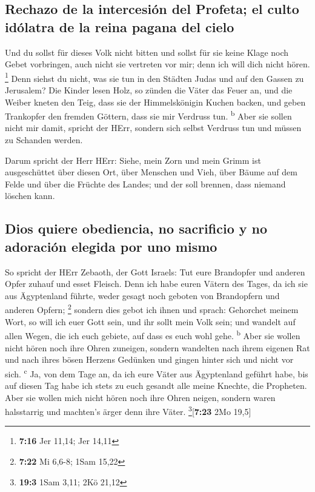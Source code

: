 \hypertarget{rechazo-de-la-intercesiuxf3n-del-profeta-el-culto-iduxf3latra-de-la-reina-pagana-del-cielo}{%
\subsection{Rechazo de la intercesión del Profeta; el culto idólatra de
la reina pagana del
cielo}\label{rechazo-de-la-intercesiuxf3n-del-profeta-el-culto-iduxf3latra-de-la-reina-pagana-del-cielo}}

 Und du sollst für dieses Volk nicht bitten und sollst
für sie keine Klage noch Gebet vorbringen, auch nicht sie vertreten vor
mir; denn ich will dich nicht hören. \footnote{\textbf{7:16} Jer 11,14;
  Jer 14,11}  Denn siehst du nicht, was sie tun in den
Städten Judas und auf den Gassen zu Jerusalem?  Die
Kinder lesen Holz, so zünden die Väter das Feuer an, und die Weiber
kneten den Teig, dass sie der Himmelskönigin Kuchen backen, und geben
Trankopfer den fremden Göttern, dass sie mir Verdruss tun.
\textsuperscript{b}  Aber sie sollen nicht mir damit,
spricht der HErr, sondern sich selbst Verdruss tun und müssen zu
Schanden werden.

 Darum spricht der Herr HErr: Siehe, mein Zorn und mein
Grimm ist ausgeschüttet über diesen Ort, über Menschen und Vieh, über
Bäume auf dem Felde und über die Früchte des Landes; und der soll
brennen, dass niemand löschen kann.

\hypertarget{dios-quiere-obediencia-no-sacrificio-y-no-adoraciuxf3n-elegida-por-uno-mismo}{%
\subsection{Dios quiere obediencia, no sacrificio y no adoración elegida
por uno
mismo}\label{dios-quiere-obediencia-no-sacrificio-y-no-adoraciuxf3n-elegida-por-uno-mismo}}

 So spricht der HErr Zebaoth, der Gott Israels: Tut eure
Brandopfer und anderen Opfer zuhauf und esset Fleisch. 
Denn ich habe euren Vätern des Tages, da ich sie aus Ägyptenland führte,
weder gesagt noch geboten von Brandopfern und anderen Opfern;
\footnote{\textbf{7:22} Mi 6,6-8; 1Sam 15,22}  sondern
dies gebot ich ihnen und sprach: Gehorchet meinem Wort, so will ich euer
Gott sein, und ihr sollt mein Volk sein; und wandelt auf allen Wegen,
die ich euch gebiete, auf dass es euch wohl gehe. \textsuperscript{b}
 Aber sie wollen nicht hören noch ihre Ohren zuneigen,
sondern wandelten nach ihrem eigenen Rat und nach ihres bösen Herzens
Gedünken und gingen hinter sich und nicht vor sich. \textsuperscript{c}
 Ja, von dem Tage an, da ich eure Väter aus Ägyptenland
geführt habe, bis auf diesen Tag habe ich stets zu euch gesandt alle
meine Knechte, die Propheten.  Aber sie wollen mich nicht
hören noch ihre Ohren neigen, sondern waren halsstarrig und machten's
ärger denn ihre Väter. \footnote{\textbf{19:3} 1Sam 3,11; 2Kö 21,12}{[}\textbf{7:23}
2Mo 19,5{]}

